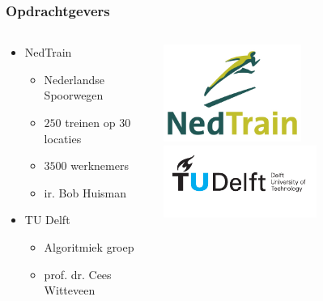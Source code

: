 \begin{frame}\frametitle{Opdrachtgevers}
\begin{columns}[T] %
    \begin{column}{.55\textwidth}
        \begin{itemize}
            \item NedTrain 
            \begin{itemize}
                \item Nederlandse Spoorwegen
                \item $250$ treinen op $30$ locaties
                \item $3500$ werknemers
                \item ir. Bob Huisman
            \end{itemize}
        \end{itemize}
        \vspace{1.8cm}
        \begin{itemize}
            \item TU Delft
            \begin{itemize}
                \item Algoritmiek groep
                \item prof. dr. Cees Witteveen
            \end{itemize}  
        \end{itemize}
    \end{column}%
    \begin{column}{.45\textwidth}
        \includegraphics[width=4.5cm]{images/logo-nedtrain.jpg}
        \vspace{1cm}
        \includegraphics[width=5cm]{images/tudelft_logo.pdf}
    \end{column}%
\end{columns}
\end{frame}

